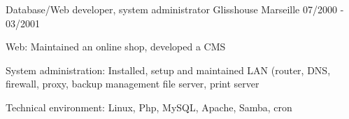 \begin{cventries}
  \cventry
    {Database/Web developer, system administrator}
    {Glisshouse}
    {Marseille}
    {07/2000 - 03/2001}
    {
      \begin{cvitems}
        \item {Web: Maintained an online shop, developed a CMS}
        \item {System administration: Installed, setup and maintained LAN
            (router, DNS, firewall, proxy, backup management file server, print
            server}
		\item {Technical environment: Linux, Php, MySQL, Apache, Samba, cron}
      \end{cvitems}
    }

\end{cventries}

